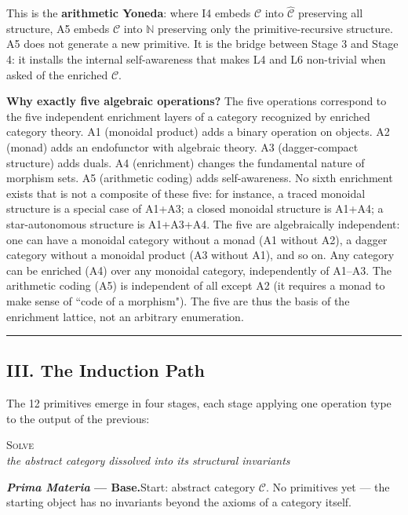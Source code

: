 \documentclass[12pt,a4paper]{article}
\begin{document}
This is the \textbf{arithmetic Yoneda}: where I4 embeds $\mathcal{C}$ into $\hat{\mathcal{C}}$ preserving all structure, A5 embeds $\mathcal{C}$ into $\mathbb{N}$ preserving only the primitive-recursive structure. A5 does not generate a new primitive. It is the bridge between Stage 3 and Stage 4: it installs the internal self-awareness that makes L4 and L6 non-trivial when asked of the enriched $\mathcal{C}$.

\textbf{Why exactly five algebraic operations?} The five operations correspond to the five independent enrichment layers of a category recognized by enriched category theory. A1 (monoidal product) adds a binary operation on objects. A2 (monad) adds an endofunctor with algebraic theory. A3 (dagger-compact structure) adds duals. A4 (enrichment) changes the fundamental nature of morphism sets. A5 (arithmetic coding) adds self-awareness. No sixth enrichment exists that is not a composite of these five: for instance, a traced monoidal structure is a special case of A1+A3; a closed monoidal structure is A1+A4; a star-autonomous structure is A1+A3+A4. The five are algebraically independent: one can have a monoidal category without a monad (A1 without A2), a dagger category without a monoidal product (A3 without A1), and so on. Any category can be enriched (A4) over any monoidal category, independently of A1--A3. The arithmetic coding (A5) is independent of all except A2 (it requires a monad to make sense of ``code of a morphism"). The five are thus the basis of the enrichment lattice, not an arbitrary enumeration.

\begin{center}
\rule{0.5\textwidth}{0.4pt}
\end{center}

\subsection{III. The Induction Path}

The 12 primitives emerge in four stages, each stage applying one operation type to the output of the previous:

\begin{center}
\vspace{0.6em}
{\large\textsc{Solve}}\\[4pt]
{\small\itshape the abstract category dissolved into its structural invariants}
\vspace{0.4em}
\end{center}

\noindent\textbf{\emph{Prima Materia} --- Base.}\quad Start: abstract category $\mathcal{C}$. No primitives yet --- the starting object has no invariants beyond the axioms of a category itself.
\end{document}

